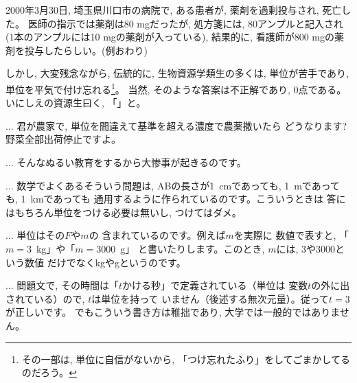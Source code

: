 \begin{exmpl} 2000年3月30日, 埼玉県川口市の病院で, 
ある患者が, 薬剤を過剰投与され, 死亡した。
医師の指示では薬剤は80 mgだったが, 処方箋には, 
80アンプルと記入され(1本のアンプルには10 mgの薬剤が入っている), 
結果的に, 看護師が800 mgの薬剤を投与したらしい。(例おわり)\end{exmpl}

しかし, 大変残念ながら, 伝統的に, 生物資源学類生の多くは, 
単位が苦手であり, 単位を平気で付け忘れる\footnote{その一部は, 
単位に自信がないから, 「つけ忘れたふり」をしてごまかしてるのだろう。}。
当然, そのような答案は不正解であり, 0点である。いにしえの資源生曰く, 
「」と。

\begin{faq}{\small{} ... 
君が農家で, 単位を間違えて基準を超える濃度で農薬撒いたら
どうなります? 野菜全部出荷停止ですよ。}


{\small{}
... そんなぬるい教育をするから大惨事が起きるのです。}

{\small{}
... 数学でよくあるそういう問題は, 
ABの長さが1~cmであっても, 1~mであっても, 1~kmであっても
通用するように作られているのです。こういうときは
答にはもちろん単位をつける必要は無いし, つけてはダメ。}

{\small{} ... 単位はその$F$や$m$の
含まれているのです。例えば$m$を実際に
数値で表すと, 「$m=3$~kg」や「$m=3000$~g」
と書いたりします。このとき, $m$には, 3や3000という数値
だけでなくkgやgというのです。}

{\small{} ... 問題文で, 
その時間は「$t$かける秒」で定義されている（単位は
変数$t$の外に出されている）ので, $t$は単位を持って
いません（後述する無次元量）。従って$t=3$が正しいです。
でもこういう書き方は稚拙であり, 大学では一般的ではありません。
}\end{faq}

